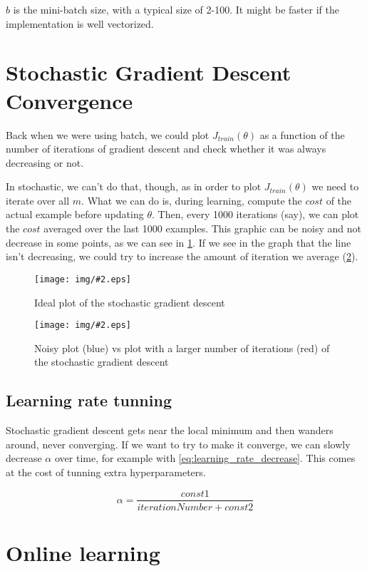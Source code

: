\documentclass[10pt]{extarticle}
\newcommand{\stdfig}[3]{
    \begin{figure}
    \centering
    \texttt{[image: img/\#2.eps]}
    \caption{#3}
    \label{fig:#2}
    \end{figure}
}
\begin{document}
$b$ is the mini-batch size, with a typical size of 2-100. It might be
faster if the implementation is well vectorized.

\section{Stochastic Gradient Descent
Convergence}\label{stochastic-gradient-descent-convergence}

Back when we were using batch, we could plot $J_{train}(\theta)$ as a
function of the number of iterations of gradient descent and check
whether it was always decreasing or not.

In stochastic, we can't do that, though, as in order to plot
$J_{train}(\theta)$ we need to iterate over all $m$. What we can do is,
during learning, compute the $cost$ of the actual example before
updating $\theta$. Then, every 1000 iterations (say), we can plot the
$cost$ averaged over the last 1000 examples. This graphic can be noisy
and not decrease in some points, as we can see in
\cref{fig:stochastic_cost_plot_ideal}. If we see in the graph that the
line isn't decreasing, we could try to increase the amount of iteration
we average (\cref{fig:stochastic_cost_plot_noisy}).

\stdfig{7cm}{stochastic_cost_plot_ideal}{Ideal plot of the stochastic gradient descent}

\stdfig{7cm}{stochastic_cost_plot_noisy}{Noisy plot (blue) vs plot with a larger number of iterations (red) of the stochastic gradient descent}

\subsection{Learning rate tunning}\label{learning-rate-tunning}

Stochastic gradient descent gets near the local minimum and then wanders
around, never converging. If we want to try to make it converge, we can
slowly decrease $\alpha$ over time, for example with
\cref{eq:learning_rate_decrease}. This comes at the cost of tunning
extra hyperparameters.

\begin{equation} \label{eq:learning_rate_decrease}
\alpha = \frac{const1}{iterationNumber + const2}
\end{equation}

\section{Online learning}\label{online-learning}
\end{document}

